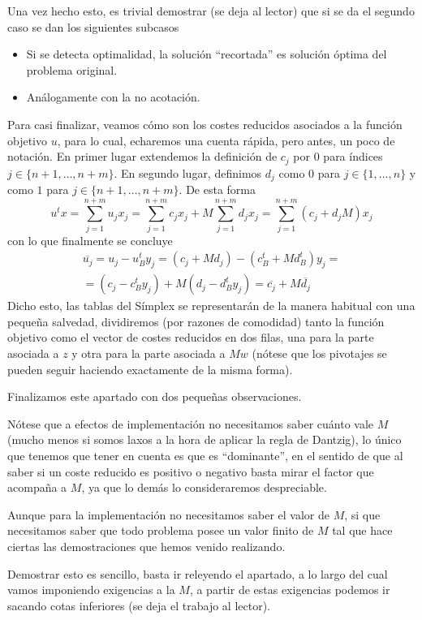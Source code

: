 Una vez hecho esto, es trivial demostrar (se deja al lector) que si se da el segundo caso se dan los siguientes subcasos
\begin{itemize}
	\item Si se detecta optimalidad, la solución ``recortada'' es solución óptima del problema original.
	\item Análogamente con la no acotación.
\end{itemize}
Para casi finalizar, veamos cómo son los costes reducidos asociados a la función objetivo $u$, para lo cual, echaremos una cuenta rápida, pero antes, un poco de notación. En primer lugar extendemos la definición de $c_j$ por $0$ para índices $j\in\{n+1,\dots,n+m\}$. En segundo lugar, definimos $d_j$ como $0$ para $j\in\{1,\dots,n\}$ y como $1$ para $j\in\{n+1,\dots,n+m\}$. De esta forma
\begin{equation*}
	u^tx=\sum_{j=1}^{n+m}u_jx_j=\sum_{j=1}^{n+m}c_jx_j+M\sum_{j=1}^{n+m}d_jx_j=\sum_{j=1}^{n+m}(c_j+d_jM)x_j
\end{equation*}
con lo que finalmente se concluye
\begin{multline*}
	\overline{u_j}=u_j-u_B^ty_j=(c_j+Md_j)-(c_B^t+Md_B^t)y_j=\\=(c_j-c_B^ty_j)+M(d_j-d_B^ty_j)=\overline{c_j}+M\overline{d_j}
\end{multline*}
Dicho esto, las tablas del Símplex se representarán de la manera habitual con una pequeña salvedad, dividiremos (por razones de comodidad) tanto la función objetivo como el vector de costes reducidos en dos filas, una para la parte asociada a $z$ y otra para la parte asociada a $Mw$ (nótese que los pivotajes se pueden seguir haciendo exactamente de la misma forma).

Finalizamos este apartado con dos pequeñas observaciones.
\begin{obs}[Implementación]
	Nótese que a efectos de implementación no necesitamos saber cuánto vale $M$ (mucho menos si somos laxos a la hora de aplicar la regla de Dantzig), lo único que tenemos que tener en cuenta es que es ``dominante'', en el sentido de que al saber si un coste reducido es positivo o negativo basta mirar el factor que acompaña a $M$, ya que lo demás lo consideraremos despreciable.
\end{obs}
\begin{obs}[Valor de $M$]
	Aunque para la implementación no necesitamos saber el valor de $M$, si que necesitamos saber que todo problema posee un valor finito de $M$ tal que hace ciertas las demostraciones que hemos venido realizando.
	
	Demostrar esto es sencillo, basta ir releyendo el apartado, a lo largo del cual vamos imponiendo exigencias a la $M$, a partir de estas exigencias podemos ir sacando cotas inferiores (se deja el trabajo al lector).
\end{obs}
